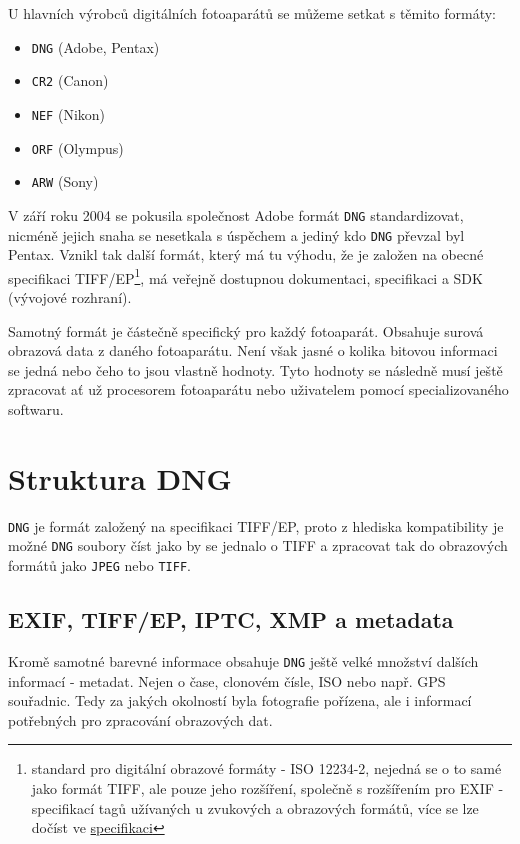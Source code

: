 \documentclass[12pt,a4paper,titlepage,final]{report}
\begin{document}
U hlavních výrobců digitálních fotoaparátů se můžeme setkat s těmito formáty:

\begin{itemize}
	\item \verb|DNG| (Adobe, Pentax)
	\item \verb|CR2| (Canon)
	\item \verb|NEF| (Nikon)
	\item \verb|ORF| (Olympus)
	\item \verb|ARW| (Sony)
\end{itemize} 

V září roku 2004 se pokusila společnost Adobe formát \verb|DNG| standardizovat, nicméně jejich snaha se nesetkala s úspěchem a jediný kdo \verb|DNG| převzal byl Pentax. Vznikl tak další formát, který má tu výhodu, že je založen na obecné specifikaci TIFF/EP\footnote{standard pro digitální obrazové formáty - ISO 12234-2, nejedná se o to samé jako formát TIFF, ale pouze jeho rozšíření, společně s rozšířením pro EXIF - specifikací tagů užívaných u zvukových a obrazových formátů, více se lze dočíst ve \hyperlink{bib}{specifikaci}}, má veřejně dostupnou dokumentaci, specifikaci a SDK (vývojové rozhraní).

Samotný formát je částečně specifický pro každý fotoaparát. Obsahuje surová obrazová data z daného fotoaparátu. Není však jasné o kolika bitovou informaci se jedná nebo čeho to jsou vlastně hodnoty. Tyto hodnoty se následně musí ještě zpracovat ať už procesorem fotoaparátu nebo uživatelem pomocí specializovaného softwaru.

\section{Struktura DNG}

\verb|DNG| je formát založený na specifikaci TIFF/EP, proto z hlediska kompatibility je možné \verb|DNG| soubory číst jako by se jednalo o TIFF a zpracovat tak do obrazových formátů jako \verb|JPEG| nebo \verb|TIFF|.

\subsection{EXIF, TIFF/EP, IPTC, XMP a metadata}

Kromě samotné barevné informace obsahuje \verb|DNG| ještě velké množství dalších informací - metadat. Nejen o čase, clonovém čísle, ISO nebo např. GPS souřadnic. Tedy za jakých okolností byla fotografie pořízena, ale i informací potřebných pro zpracování obrazových dat.
\end{document}
